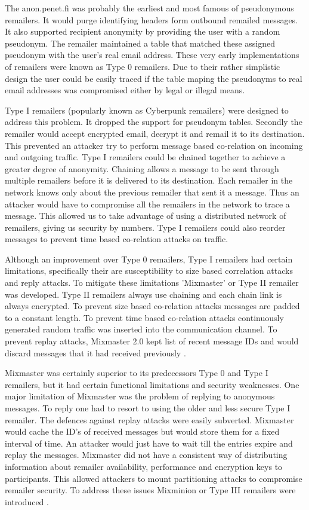 \documentclass{llncs}
\begin{document}
The anon.penet.fi was probably the earliest and most famous of pseudonymous remailers. It would purge identifying headers form outbound remailed messages. It also supported recipient anonymity by providing the user with a random pseudonym. The remailer maintained a table that matched these assigned pseudonym with the user's real email address. These very early implementations of remailers were known as Type 0 remailers. Due to their rather simplistic design the user could be easily traced if the table maping the pseudonyms to real email addresses was compromised either by legal or illegal means.

Type I remailers (popularly known as Cyberpunk remailers) were designed to address this problem. It dropped the support for pseudonym tables. Secondly the remailer would accept encrypted email, decrypt it and remail it to its destination. This prevented an attacker try to perform message based co-relation on incoming and outgoing traffic. Type I remailers could be chained together to achieve a greater degree of anonymity. Chaining allows a message to be sent through multiple remailers before it is delivered to its destination. Each remailer in the network knows only about the previous remailer that sent it a message. Thus an attacker would have to compromise all the remailers in the network to trace a message. This allowed us to take advantage of using a distributed network of remailers, giving us security by numbers. Type I remailers could also reorder messages to prevent time based co-relation attacks on traffic.

Although an improvement over Type 0 remailers, Type I remailers had certain limitations, specifically their are susceptibility to size based correlation attacks and reply attacks. To mitigate these limitations 'Mixmaster' or Type II remailer was developed. Type II remailers always use chaining and each chain link is always encrypted. To prevent size based co-relation attacks messages are padded to a constant length. To prevent time based co-relation attacks continuously generated random traffic was inserted into the communication channel. To prevent replay attacks, Mixmaster 2.0 kept list of recent message IDs and would discard messages that it had received previously \cite{mixmaster-spec}.

Mixmaster was certainly superior to its predecessors Type 0 and Type I remailers, but it had certain functional limitations and security weaknesses. One major limitation of Mixmaster was the problem of replying to anonymous messages. To reply one had to resort to using the older and less secure Type I remailer. The defences against replay attacks were easily subverted. Mixmaster would cache the ID's of received messages but would store them for a fixed interval of time. An attacker would just have to wait till the entries expire and replay the messages. Mixmaster did not have a consistent way of distributing information about remailer availability, performance and encryption keys to participants. This allowed attackers to mount partitioning attacks to compromise remailer security. To address these issues Mixminion or Type III remailers were introduced \cite{minion-design}.
\end{document}
